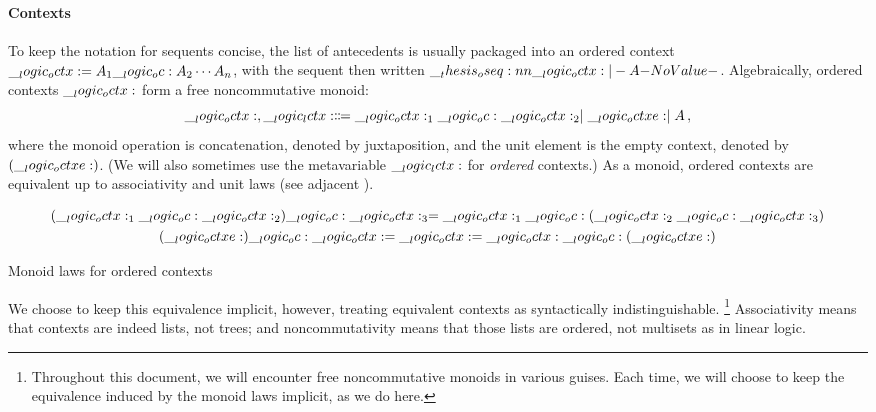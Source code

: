 \paragraph{Contexts}
To keep the notation for sequents concise, the list of antecedents is usually packaged into an ordered context $\__logic_octx: = A_1 \__logic_oc: A_2 \dotsb A_n$, with the sequent then written $\oseq{\octx |- A}$.
Algebraically, ordered contexts $\__logic_octx:$ form a free noncommutative monoid:
\begin{equation*}
  \__logic_octx: , \__logic_lctx: \Coloneqq \__logic_octx:_1 \__logic_oc: \__logic_octx:_2 \mid \__logic_octxe: \mid A \,,
\end{equation*}
where the monoid operation is concatenation, denoted by juxtaposition, and the unit element is the empty context, denoted by $(\__logic_octxe:)$.
(We will also sometimes use the metavariable $\__logic_lctx:$ for \emph{ordered} contexts.)
As a monoid, ordered contexts are equivalent up to associativity and unit laws (see adjacent ).%
\begin{marginfigure}[-5\baselineskip]
  \begin{gather*}
    (\__logic_octx:_1 \__logic_oc: \__logic_octx:_2) \__logic_oc: \__logic_octx:_3 = \__logic_octx:_1 \__logic_oc: (\__logic_octx:_2 \__logic_oc: \__logic_octx:_3) \\
    (\__logic_octxe:) \__logic_oc: \__logic_octx: = \__logic_octx: = \__logic_octx: \__logic_oc: (\__logic_octxe:)
  \end{gather*}
  \caption{Monoid laws for ordered contexts}\label{fig:ordered-logic:monoid-laws}
\end{marginfigure}
We choose to keep this equivalence implicit, however, treating equivalent contexts as syntactically indistinguishable.%
\footnote{Throughout this document, we will encoun\-ter free noncommutative monoids in various guises.
Each time, we will choose to keep the equivalence induced by the monoid laws implicit, as we do here.}
%
Associativity means that contexts are indeed lists, not trees; and noncommutativity means that those lists are ordered, not multisets as in linear logic.





